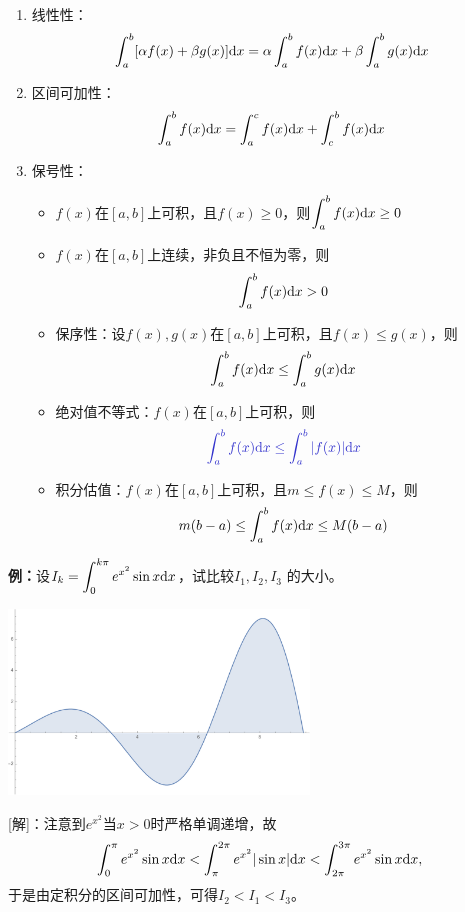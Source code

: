 \begin{thx}
	\begin{enumerate}[(1)]
	  \item {\kaishu 线性性：}
	  $$\displaystyle\int_a^b[\alpha
	  f(x)+\beta g(x)]\mathrm{d} x=\alpha\displaystyle\int_a^bf(x)\mathrm{d} x+\beta\displaystyle\int_a^bg(x)\mathrm{d} x$$
	  \item {\kaishu 区间可加性：}
	  $$\displaystyle\int_a^bf(x)\mathrm{d} x=\displaystyle\int_a^cf(x)\mathrm{d} x+\displaystyle\int_c^bf(x)\mathrm{d} x$$
	  \item {\kaishu 保号性：}%
	  \begin{itemize}
	    \item $f(x)$在$[a,b]$上可积，且$f(x)\geq 0$，则$\displaystyle\int_a^bf(x)\mathrm{d} x\geq 0$ 
	    \item $f(x)$在$[a,b]$上连续，非负且不恒为零，则$$\displaystyle\int_a^bf(x)\mathrm{d} x> 0$$ 
	    \item {\kaishu 保序性：}设$f(x),g(x)$在$[a,b]$上可积，且$f(x)\leq g(x)$，则
	    $$\displaystyle\int_a^bf(x)\mathrm{d} x\leq \displaystyle\int_a^bg(x)\mathrm{d} x$$
	    \item {\kaishu 绝对值不等式：}$f(x)$在$[a,b]$上可积，则
	    $${\b \dint_a^bf(x)\d x\leq\dint_a^b|f(x)|\d x}$$ 
	    \item {\kaishu 积分估值：}$f(x)$在$[a,b]$上可积，且$m\leq f(x)\leq M$，则
	    $$m(b-a)\leq\displaystyle\int_a^bf(x)\mathrm{d} x\leq M(b-a)$$
	  \end{itemize}
	\end{enumerate}
\end{thx}

{\bf 例：}设$I_k=\displaystyle\int_0^{k\pi}e^{x^2}\sin x\mathrm{d} x$，试比较$I_1,I_2,I_3$
的大小。

\begin{center}
	\includegraphics[width=8cm]{./images/ch5/ex2sinx.pdf}
\end{center}

[解]：注意到$e^{x^2}$当$x>0$时严格单调递增，故
$$\displaystyle\int_0^{\pi}e^{x^2}\sin x\mathrm{d} x
<\displaystyle\int_{\pi}^{2\pi}e^{x^2}|\sin x|\mathrm{d} x
<\displaystyle\int_{2\pi}^{3\pi}e^{x^2}\sin x\mathrm{d} x,$$
于是由定积分的区间可加性，可得$I_2<I_1<I_3$。\fin

